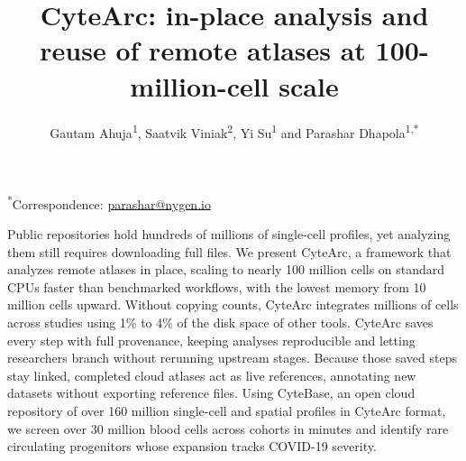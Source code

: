 \documentclass[11pt]{article}
\title{CyteArc: in-place analysis and reuse of remote atlases at 100-million-cell scale}
\author{Gautam Ahuja\textsuperscript{1},
  Saatvik Viniak\textsuperscript{2},
  Yi Su\textsuperscript{1} and
  Parashar Dhapola\textsuperscript{1,*}}
\affil{\textsuperscript{1}Nygen Analytics AB, Medicon Village, 223 81 Lund, Sweden\\
  \textsuperscript{2}University of Illinois Chicago, Chicago, Illinois, USA}
\makeatletter
\renewenvironment{abstract}{%
  \par\vspace{0.7em}%
  \noindent{\color{rulegrey}\rule{\textwidth}{0.45pt}}\par\vspace{0.55em}%
  \noindent{\sffamily\normalsize\bfseries\color{ink}Abstract}\par\vspace{0.35em}%
  \setstretch{1.15}\small\color{ink}\setlength{\parindent}{0pt}\setlength{\parskip}{0.45em}%
}{%
  \par\vspace{0.55em}\noindent{\color{rulegrey}\rule{\textwidth}{0.45pt}}\par\vspace{0.75em}%
  \aftergroup\manuscriptlinenumbers
  \aftergroup\@afterindentfalse
  \aftergroup\@afterheading
}
\makeatother
\begin{document}
\maketitle
{\raggedright\small\color{black!70}\textsuperscript{*}Correspondence: \href{mailto:parashar@nygen.io}{parashar@nygen.io}\par}

\begin{abstract}
Public repositories hold hundreds of millions of single-cell profiles, yet analyzing them still requires downloading full files. We present CyteArc, a framework that analyzes remote atlases in place, scaling to nearly 100 million cells on standard CPUs faster than benchmarked workflows, with the lowest memory from 10 million cells upward. Without copying counts, CyteArc integrates millions of cells across studies using 1\% to 4\% of the disk space of other tools. CyteArc saves every step with full provenance, keeping analyses reproducible and letting researchers branch without rerunning upstream stages. Because those saved steps stay linked, completed cloud atlases act as live references, annotating new datasets without exporting reference files. Using CyteBase, an open cloud repository of over 160 million single-cell and spatial profiles in CyteArc format, we screen over 30 million blood cells across cohorts in minutes and identify rare circulating progenitors whose expansion tracks COVID-19 severity.
\end{abstract}
\end{document}
